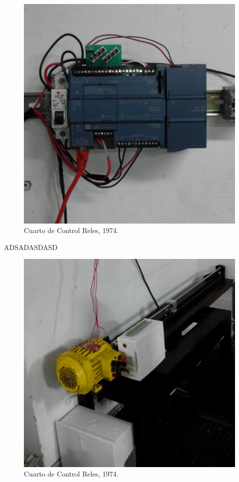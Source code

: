 \documentclass[jou,apacite]{apa6}   %
\begin{document}
\begin{figure}[htb]
\centering
\includegraphics[scale=0.2]{images/s71200.jpg}
\caption{Cuarto de Control Reles, 1974.} \label{fig:s7200}
\end{figure}
ADSADASDASD
\begin{figure}[htb]
\centering
\includegraphics[scale=0.2]{images/motorsimulacion.jpg}
\caption{Cuarto de Control Reles, 1974.} \label{fig:horizonte}
\end{figure}
\end{document}
